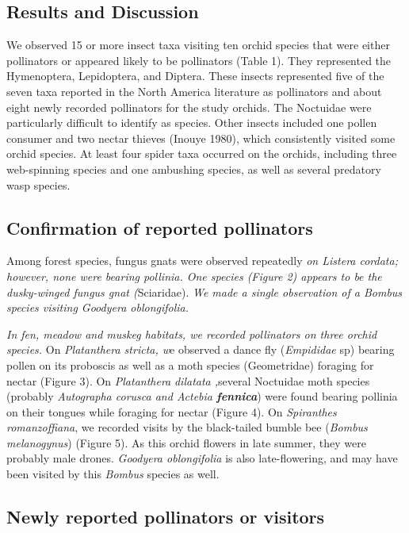 \begin{multicols}{2}
\section{Results and Discussion}

We observed 15 or more insect taxa visiting ten orchid species that were
either pollinators or appeared likely to be pollinators (Table 1). They
represented the Hymenoptera, Lepidoptera, and Diptera. These insects
represented five of the seven taxa reported in the North America
literature as pollinators and about eight newly recorded pollinators for
the study orchids. The Noctuidae were particularly difficult to identify
as species. Other insects included one pollen consumer and two nectar
thieves (Inouye 1980), which consistently visited some orchid species.
At least four spider taxa occurred on the orchids, including three
web-spinning species and one ambushing species, as well as several
predatory wasp species.

\subsection{Confirmation of reported pollinators}

Among forest species, fungus gnats were observed repeatedly \emph{on
Listera cordata; however, none were bearing pollinia. One species
(Figure 2) appears to be the dusky-winged fungus gnat (}Sciaridae).
\emph{We made a single observation of a Bombus species visiting Goodyera
oblongifolia.}

\emph{In fen, meadow and muskeg habitats, we recorded pollinators on
three orchid species.} On \emph{Platanthera stricta, w}e observed a
dance fly (\emph{Empididae} sp) bearing pollen on its proboscis as well
as a moth species (Geometridae) foraging for nectar (Figure 3). On
\emph{Platanthera} \emph{dilatata ,}several Noctuidae moth species
(probably \emph{Autographa corusca and Actebia \textbf{fennica}}) were
found bearing pollinia on their tongues while foraging for nectar
(Figure 4). On \emph{Spiranthes romanzoffiana}, we recorded visits by
the black-tailed bumble bee (\emph{Bombus melanogynus}) (Figure 5). As
this orchid flowers in late summer, they were probably male drones.
\emph{Goodyera oblongifolia} is also late-flowering, and may have been
visited by this \emph{Bombus} species as well.

\subsection{Newly reported pollinators or visitors}


\end{multicols}

